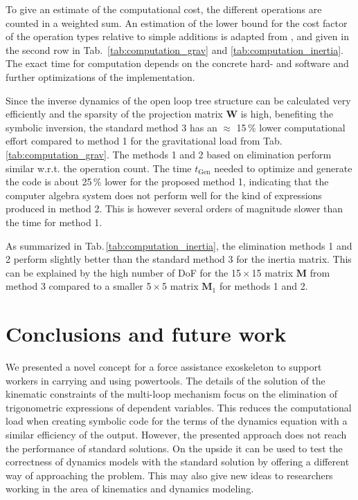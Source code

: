 \documentclass[twocolumn,10pt]{IFTOMM}
\newcommand{\bm}[1]{\boldsymbol{#1}}
\begin{document}
To give an estimate of the computational cost, the different operations are counted in a weighted sum. An estimation of the lower bound for the cost factor of the operation types relative to simple additions is adapted from \cite{Atkinson2014}, \cite{Hindriksen2012} and given in the second row in Tab.\, \ref{tab:computation_grav} and \ref{tab:computation_inertia}.
The exact time for computation depends on the concrete hard- and software and further optimizations of the implementation.

Since the inverse dynamics of the open loop tree structure can be calculated very efficiently and the sparsity of the projection matrix $\bm{W}$ is high, benefiting the symbolic inversion, the standard method 3 has an $\approx$ 15\,\% lower computational effort compared to method 1 for the gravitational load from Tab.\,\ref{tab:computation_grav}.
The methods 1 and 2 based on elimination perform similar w.r.t. the operation count.
The time $t_{\mathrm{Gen}}$ needed to optimize and generate the code is about 25\,\% lower for the proposed method 1, indicating that the computer algebra system does not perform well for the kind of expressions produced in method 2.
This is however several orders of magnitude slower than the time for method 1.

As summarized in Tab.\,\ref{tab:computation_inertia}, the elimination methods 1 and 2 perform slightly better than the standard method 3 for the inertia matrix.
This can be explained by the high number of DoF for the 15\,$\times$\,15 matrix $\bm{M}$ from method 3 compared to a smaller 5\,$\times$\,5 matrix $\bm{M}_1$ for methods 1 and 2.

\section{Conclusions and future work}
\label{sec:conclusion}

We presented a novel concept for a force assistance exoskeleton to support workers in carrying and using powertools.
The details of the solution of the kinematic constraints of the multi-loop mechanism focus on the elimination of trigonometric expressions of dependent variables.
This reduces the computational load when creating symbolic code for the terms of the dynamics equation with a similar efficiency of the output.
However, the presented approach does not reach the performance of standard solutions.
On the upside it can be used to test the correctness of dynamics models with the standard solution by offering a different way of approaching the problem.
This may also give new ideas to researchers working in the area of kinematics and dynamics modeling.
\end{document}
